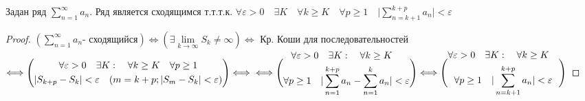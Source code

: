 \documentclass[14pt,a4paper]{scrartcl}
\theoremstyle{definition}
\theoremstyle{remark}
\theoremstyle{definition}
\theoremstyle{definition}
\begin{document}
\begin{boxteo} \qquad\qquad
  Задан ряд $ \sum\limits_{n = 1}^{ \infty}{a_n} $. Ряд является сходящимся т.т.т.к. $\forall \varepsilon > 0 \quad \exists K \quad \forall k\geq K \quad \forall p \geq 1 \quad \vert \sum\limits_{n = k+1}^{k+p}{a_n}  \vert <\varepsilon  $\\

\end{boxteo}
\begin{proof}
 $( \sum\limits_{n = 1}^{ \infty}{a_n} \text{- сходящийся}) \Leftrightarrow (\exists  \lim\limits_{k\to  \infty}{S_k} \neq \infty ) \Leftrightarrow $ Кр. Коши для последовательностей $ \Longleftrightarrow \Bigg(  \begin{gathered}
   \forall \varepsilon > 0 \quad \exists K: \quad \forall k \geq K \quad \forall p\geq 1 \\
   \vert S_{k+p} - S_k \vert < \varepsilon \quad (m = k+p; \vert S_m - S_k \vert < \varepsilon )
 \end{gathered} \Bigg) \Longleftrightarrow \\ \Longleftrightarrow
 \Bigg(  \begin{gathered}
   \forall \varepsilon > 0 \quad \exists K: \quad \forall k \geq K \quad \\ \forall p\geq 1 \quad
   \vert  \sum\limits_{n = 1}^{k+p}{a_n} -  \sum\limits_{n = 1}^{k}{a_n} \vert < \varepsilon
 \end{gathered} \Bigg)
 \Longleftrightarrow
 \Bigg(  \begin{gathered}
   \forall \varepsilon > 0 \quad \exists K: \quad \forall k \geq K \quad \\ \forall  p\geq 1 \quad
   \vert  \sum\limits_{n = k+1}^{k+p}{a_n} \vert < \varepsilon
 \end{gathered} \Bigg)
 \\ $
\end{proof}
\pagebreak
\end{document}
